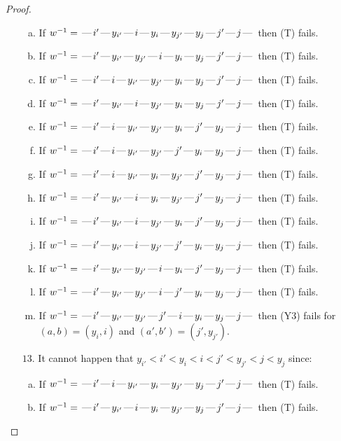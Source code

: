 \documentclass[10pt]{article}
\theoremstyle{definition}
\theoremstyle{definition}
\def\dash{\text{\hspace{0.5mm}---\hspace{0.5mm}}}
\begin{document}
\begin{proof}
\begin{enumerate}
\begin{enumerate}[(a)]
\item If $w^{-1} = \dash i'\dash y_{i'}\dash i\dash y_i\dash y_{j'}\dash y_j\dash j'\dash j\dash $ then (T) fails.
\item If $w^{-1} = \dash i'\dash y_{i'}\dash y_{j'}\dash i\dash y_i\dash y_j\dash j'\dash j\dash $ then (T) fails.
\item If $w^{-1} = \dash i'\dash i\dash y_{i'}\dash y_{j'}\dash y_i\dash y_j\dash j'\dash j\dash $ then (T) fails.
\item If $w^{-1} = \dash i'\dash y_{i'}\dash i\dash y_{j'}\dash y_i\dash y_j\dash j'\dash j\dash $ then (T) fails.
\item If $w^{-1} = \dash i'\dash i\dash y_{i'}\dash y_{j'}\dash y_i\dash j'\dash y_j\dash j\dash $ then (T) fails.
\item If $w^{-1} = \dash i'\dash i\dash y_{i'}\dash y_{j'}\dash j'\dash y_i\dash y_j\dash j\dash $ then (T) fails.
\item If $w^{-1} = \dash i'\dash i\dash y_{i'}\dash y_i\dash y_{j'}\dash j'\dash y_j\dash j\dash $ then (T) fails.
\item If $w^{-1} = \dash i'\dash y_{i'}\dash i\dash y_i\dash y_{j'}\dash j'\dash y_j\dash j\dash $ then (T) fails.
\item If $w^{-1} = \dash i'\dash y_{i'}\dash i\dash y_{j'}\dash y_i\dash j'\dash y_j\dash j\dash $ then (T) fails.
\item If $w^{-1} = \dash i'\dash y_{i'}\dash i\dash y_{j'}\dash j'\dash y_i\dash y_j\dash j\dash $ then (T) fails.
\item If $w^{-1} = \dash i'\dash y_{i'}\dash y_{j'}\dash i\dash y_i\dash j'\dash y_j\dash j\dash $ then (T) fails.
\item If $w^{-1} = \dash i'\dash y_{i'}\dash y_{j'}\dash i\dash j'\dash y_i\dash y_j\dash j\dash $ then (T) fails.
\item If $w^{-1} = \dash i'\dash y_{i'}\dash y_{j'}\dash j'\dash i\dash y_i\dash y_j\dash j\dash $ then (Y3) fails for $(a,b)=(y_i,i)$ and $(a',b')=(j',y_{j'})$.
\end{enumerate}
\item[$13$.] It cannot happen that $y_{i'} < i' < y_i < i < j' < y_{j'} < j < y_j$ since:
\begin{enumerate}[(a)]
\item If $w^{-1} = \dash i'\dash i\dash y_{i'}\dash y_i\dash y_{j'}\dash y_j\dash j'\dash j\dash $ then (T) fails.
\item If $w^{-1} = \dash i'\dash y_{i'}\dash i\dash y_i\dash y_{j'}\dash y_j\dash j'\dash j\dash $ then (T) fails.

\end{enumerate}
\end{enumerate}
\end{proof}
\end{document}
